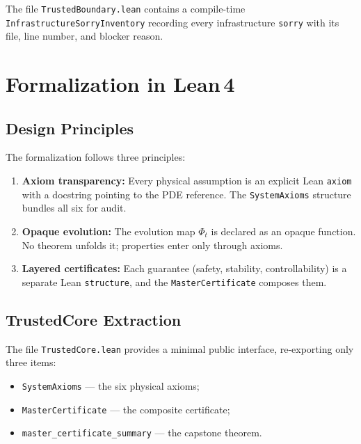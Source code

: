 \documentclass[11pt,a4paper]{article}
\theoremstyle{plain}
\theoremstyle{definition}
\theoremstyle{remark}
\newcommand{\sorry}{\texttt{sorry}}
\newcommand{\leaninline}[1]{\texttt{#1}}
\begin{document}
The file \leaninline{TrustedBoundary.lean} contains a compile-time
\leaninline{InfrastructureSorryInventory} recording every infrastructure
\sorry{} with its file, line number, and blocker reason.


\section{Formalization in Lean\,4}\label{sec:lean}

\subsection{Design Principles}

The formalization follows three principles:

\begin{enumerate}
  \item \textbf{Axiom transparency:} Every physical assumption is an
    explicit Lean \texttt{axiom} with a docstring pointing to the PDE
    reference.  The \leaninline{SystemAxioms} structure bundles all six
    for audit.
  \item \textbf{Opaque evolution:} The evolution map $\Phi_t$ is declared
    as an opaque function.  No theorem unfolds it; properties enter only
    through axioms.
  \item \textbf{Layered certificates:} Each guarantee (safety, stability,
    controllability) is a separate Lean \texttt{structure}, and the
    \leaninline{MasterCertificate} composes them.
\end{enumerate}

\subsection{TrustedCore Extraction}

The file \leaninline{TrustedCore.lean} provides a minimal public
interface, re-exporting only three items:
\begin{itemize}
  \item \leaninline{SystemAxioms} --- the six physical axioms;
  \item \leaninline{MasterCertificate} --- the composite certificate;
  \item \leaninline{master\_certificate\_summary} --- the capstone theorem.
\end{itemize}
\end{document}
